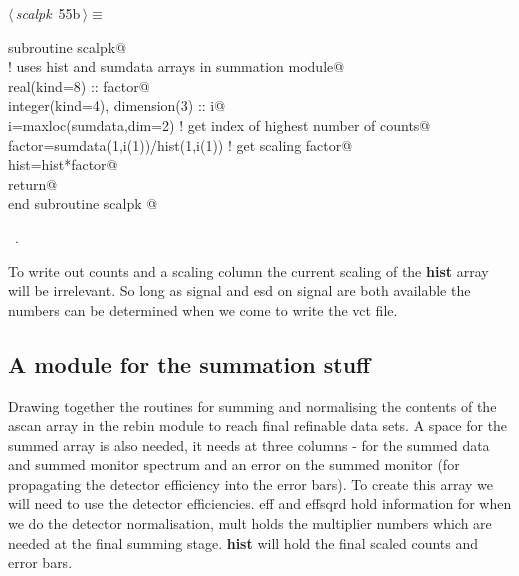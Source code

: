 \documentclass[10pt,a4paper,notitlepage]{article}
\newcommand{\var}[1]{\textbf{\textsf{#1}}} %
\begin{document}
\begin{flushleft} \small
\begin{minipage}{\linewidth}\label{scrap59}\raggedright\small
{} $\langle\,${\it scalpk}\nobreak\ {\footnotesize {55b}}$\,\rangle\equiv$
\vspace{-1ex}
\begin{list}{}{} \item
\mbox{}\verb@      subroutine scalpk@\\
\mbox{}\verb@! uses hist and sumdata arrays in summation module@\\
\mbox{}\verb@      real(kind=8) :: factor@\\
\mbox{}\verb@      integer(kind=4), dimension(3) :: i@\\
\mbox{}\verb@      i=maxloc(sumdata,dim=2)  ! get index of highest number of counts@\\
\mbox{}\verb@      factor=sumdata(1,i(1))/hist(1,i(1)) ! get scaling factor@\\
\mbox{}\verb@      hist=hist*factor@\\
\mbox{}\verb@      return@\\
\mbox{}\verb@      end subroutine scalpk                                                @{\NWsep}
\end{list}
\vspace{-1.5ex}
\footnotesize
\begin{list}{}{\setlength{\itemsep}{-\parsep}\setlength{\itemindent}{-\leftmargin}}
\item \NWtxtMacroRefIn\ .

\item{}
\end{list}
\end{minipage}\vspace{4ex}
\end{flushleft}
To write out counts and a scaling column the current scaling of the \var{hist}
array will be irrelevant. 
So long as signal and esd on signal are both available the numbers can be 
determined when we come to write the vct file.



\subsection{A module for the summation stuff}

Drawing together the routines for summing and normalising the contents of the
ascan array in the rebin module to reach final refinable data sets.
A space for the summed array is also needed, it needs
at three columns - for the summed data and summed monitor spectrum
and an error on the summed monitor (for propagating the detector
efficiency into the error bars).
To create this array we will need to use the detector efficiencies. 
eff and effsqrd hold information for when we do the  detector
normalisation, mult holds the multiplier numbers 
which are needed at the final summing stage. 
\var{hist} will hold the final scaled counts and error bars.
\end{document}
